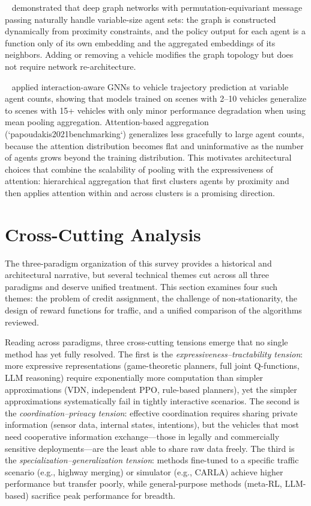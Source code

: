 \documentclass[12pt, a4paper]{article}
\begin{document}
\citeauthor{li2020deep}~\cite{li2020deep} demonstrated that deep graph
networks with permutation-equivariant message passing naturally handle
variable-size agent sets: the graph is constructed dynamically from proximity
constraints, and the policy output for each agent is a function only of its
own embedding and the aggregated embeddings of its neighbors.  Adding or
removing a vehicle modifies the graph topology but does not require network
re-architecture.

\citeauthor{deo2020trajectory}~\cite{deo2020trajectory} applied interaction-aware
GNNs to vehicle trajectory prediction at variable agent counts, showing that
models trained on scenes with 2--10 vehicles generalize to scenes with
15+ vehicles with only minor performance degradation when using mean pooling
aggregation.  Attention-based aggregation (`papoudakis2021benchmarking`)
generalizes less gracefully to large agent counts, because the attention
distribution becomes flat and uninformative as the number of agents grows
beyond the training distribution.  This motivates architectural choices
that combine the scalability of pooling with the expressiveness of attention:
hierarchical aggregation that first clusters agents by proximity and then
applies attention within and across clusters is a promising direction.

\section{Cross-Cutting Analysis}
\label{sec:crosscut}

The three-paradigm organization of this survey provides a historical and
architectural narrative, but several technical themes cut across all three
paradigms and deserve unified treatment.  This section examines four such
themes: the problem of credit assignment, the challenge of non-stationarity,
the design of reward functions for traffic, and a unified comparison of
the algorithms reviewed.

Reading across paradigms, three cross-cutting tensions emerge that no single
method has yet fully resolved.  The first is the \emph{expressiveness--tractability
tension}: more expressive representations (game-theoretic planners, full joint
Q-functions, LLM reasoning) require exponentially more computation than
simpler approximations (VDN, independent PPO, rule-based planners), yet the
simpler approximations systematically fail in tightly interactive scenarios.
The second is the \emph{coordination--privacy tension}: effective coordination
requires sharing private information (sensor data, internal states, intentions),
but the vehicles that most need cooperative information exchange---those in
legally and commercially sensitive deployments---are the least able to share
raw data freely.  The third is the \emph{specialization--generalization tension}:
methods fine-tuned to a specific traffic scenario (e.g., highway merging) or
simulator (e.g., CARLA) achieve higher performance but transfer poorly,
while general-purpose methods (meta-RL, LLM-based) sacrifice peak performance
for breadth.
\end{document}
